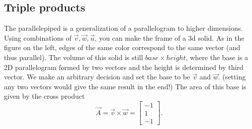 \subsection{Triple products}


The parallelepiped is a generalization of a parallelogram to higher dimensions. Using combinations of $\vec{v},\vec{w},\vec{u}$, you can make the frame of a 3d solid. As in the figure on the left, edges of the same color correspond to the same vector (and thus parallel). The volume of this solid is still $base \times height$, where the base is a 2D parallelogram formed by two vectors and the height is determined by third vector. We make an arbitrary decision and set the base to be $\vec{v}$ and $\vec{w}$. (setting any two vectors would give the same result in the end!) The area of this base is given by the cross product
\[
	\vec{A}=\vec{v}\times\vec{w} = \begin{bmatrix}
		-1\\1\\-1
	\end{bmatrix}.
\]\ \\

